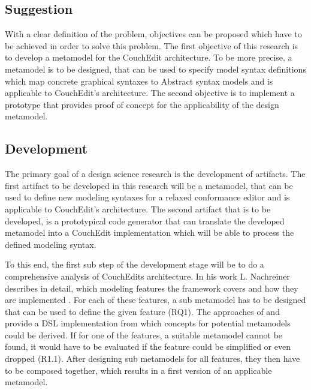 \documentclass[10pt,a4paper,oneside]{scrartcl}
\begin{document}
\subsection{Suggestion}
With a clear definition of the problem, objectives can be proposed which have to be achieved in order to solve this problem. The first objective of this research is to develop a metamodel for the CouchEdit architecture. To be more precise, a metamodel is to be designed, that can be used to specify model syntax definitions which map concrete graphical syntaxes to Abstract syntax models and is applicable to CouchEdit's architecture. The second objective is to implement a prototype that provides proof of concept for the applicability of the design metamodel.


\subsection{Development}
The primary goal of a design science research is the development of artifacts.
The first artifact to be developed in this research will be a metamodel, that can be used to define new modeling syntaxes for a relaxed conformance editor and is applicable to CouchEdit's architecture. The second artifact that is to be developed, is a prototypical code generator that can translate the developed metamodel into a CouchEdit implementation which will be able to process the defined modeling syntax.

To this end, the first sub step of the development stage will be to do a comprehensive analysis of CouchEdits architecture. In his work L. Nachreiner describes in detail, which modeling features the framework covers and how they are implemented \cite{nachreiner_couchedit_2020}. For each of these features, a sub metamodel has to be designed that can be used to define the given feature (RQ1). The approaches of \cite{minas_specifying_2001} and \cite{fondement_making_2005} provide a DSL implementation from which concepts for potential metamodels could be derived. If for one of the features, a suitable metamodel cannot be found, it would have to be evaluated if the feature could be simplified or even dropped (R1.1). After designing sub metamodels for all features, they then have to be composed together, which results in a first version of an applicable metamodel. 


\end{document}
